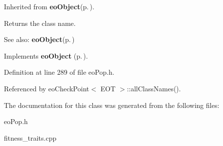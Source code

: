 Inherited from {\bf eo\-Object}{\rm (p.\,\pageref{classeo_object})}. 

Returns the class name. \begin{Desc}
\item[See also:]{\bf eo\-Object}{\rm (p.\,\pageref{classeo_object})} \end{Desc}


Implements {\bf eo\-Object} {\rm (p.\,\pageref{classeo_object_a1})}.

Definition at line 289 of file eo\-Pop.h.

Referenced by eo\-Check\-Point$<$ EOT $>$::all\-Class\-Names().

The documentation for this class was generated from the following files:\begin{CompactItemize}
\item 
eo\-Pop.h\item 
fitness\_\-traits.cpp\end{CompactItemize}
